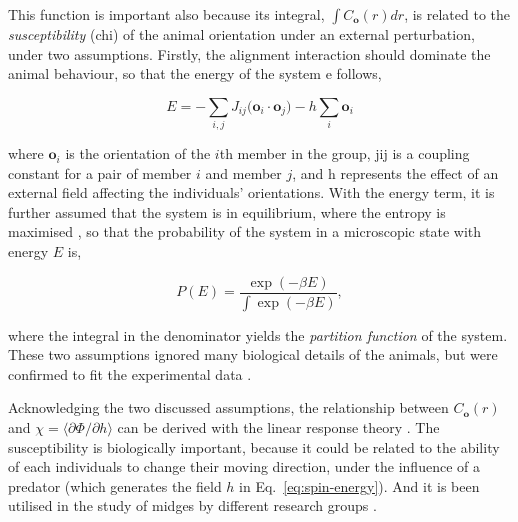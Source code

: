 \documentclass[11pt,twoside]{report}
\begin{document}
This function is important also because its integral, $\int C_\mathbf{o}(r) dr$, is related to the \emph{susceptibility} (\gls{chi}) of the animal orientation under an external perturbation, under two assumptions. Firstly, the alignment interaction should dominate the animal behaviour, so that the energy of the system \gls{e} follows,

\begin{equation}
	E = -\sum_{i, j}{J_{ij} (\mathbf{o}_i \cdot \mathbf{o}_j})	- 
	h \sum_i{\mathbf{o}_i}
\label{eq:spin-energy}
\end{equation}

\noindent where $\mathbf{o}_i$ is the orientation of the $i$th member in the group, \gls{jij} is a coupling constant for a pair of member $i$ and member $j$, and \gls{h} represents the effect of an external field affecting the individuals' orientations. With the energy term, it is further assumed that the system is in equilibrium, where the entropy is maximised \cite{bialek2011}, so that the probability of the system in a microscopic state with energy $E$ is,

\begin{equation*}
	P(E) = \frac{\exp(-\beta E)}{\int \exp(-\beta E)},
\end{equation*}

\noindent where the integral in the denominator yields the \emph{partition function} of the system. These two assumptions ignored many biological details of the animals, but were confirmed to fit the experimental data \cite{bialek2011}.

Acknowledging the two discussed assumptions, the relationship between $C_\mathbf{o}(r)$ and $\chi = \langle \partial \Phi / \partial h \rangle$ can be derived with the linear response theory \cite{herbut2007, attanasi2014pcb}. The susceptibility is biologically important, because it could be related to the ability of each individuals to change their moving direction, under the influence of a predator (which generates the field $h$ in Eq.~\ref{eq:spin-energy}). And it is been utilised in the study of midges by different research groups \cite{attanasi2014pcb, vandervaart2020}.
\end{document}

